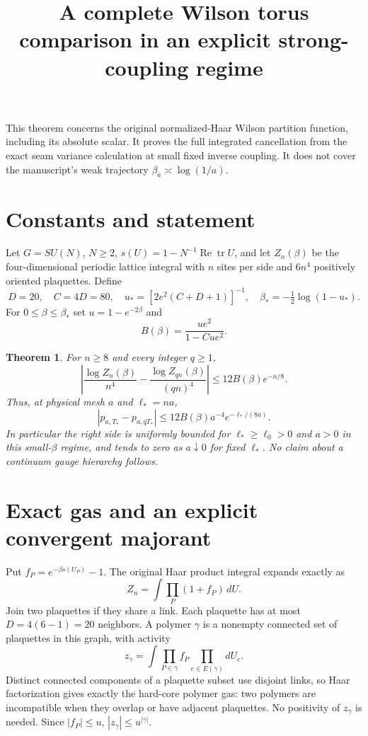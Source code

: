 \documentclass{article}
\title{A complete Wilson torus comparison in an explicit strong-coupling regime}\author{}\date{}
\newtheorem{theorem}{Theorem}
\begin{document}
\maketitle
This theorem concerns the original normalized-Haar Wilson partition function, including its absolute scalar. It proves the full integrated cancellation from the exact seam variance calculation at small fixed inverse coupling. It does not cover the manuscript's weak trajectory $\beta_a\asymp\log(1/a)$.

\section{Constants and statement}
Let $G=SU(N)$, $N\geq2$, $s(U)=1-N^{-1}\operatorname{Re}\operatorname{tr}U$, and let $Z_n(\beta)$ be the four-dimensional periodic lattice integral with $n$ sites per side and $6n^4$ positively oriented plaquettes. Define
\[
 D=20,\quad C=4D=80,\quad
 u_*=[2e^2(C+D+1)]^{-1},\quad
 \beta_*=-\tfrac12\log(1-u_*).
 \tag{1}
\]
For $0\leq\beta\leq\beta_*$ set $u=1-e^{-2\beta}$ and
\[
 B(\beta)=\frac{ue^2}{1-Cue^2}.
 \tag{2}
\]
\begin{theorem}
For $n\geq8$ and every integer $q\geq1$,
\[
 \left|\frac{\log Z_n(\beta)}{n^4}
 -\frac{\log Z_{qn}(\beta)}{(qn)^4}\right|
 \leq12B(\beta)e^{-n/8}.
 \tag{3}
\]
Thus, at physical mesh $a$ and $\ell_*=na$,
\[
 |p_{a,T_*}-p_{a,qT_*}|\leq
 12B(\beta)a^{-4}e^{-\ell_*/(8a)}.
 \tag{4}
\]
In particular the right side is uniformly bounded for $\ell_*\geq\ell_0>0$ and $a>0$ in this small-$\beta$ regime, and tends to zero as $a\downarrow0$ for fixed $\ell_*$. No claim about a continuum gauge hierarchy follows.
\end{theorem}

\section{Exact gas and an explicit convergent majorant}
Put $f_P=e^{-\beta s(U_P)}-1$. The original Haar product integral expands exactly as
\[
 Z_n=\int\prod_P(1+f_P)\,dU.
\]
Join two plaquettes if they share a link. Each plaquette has at most $D=4(6-1)=20$ neighbors. A polymer $\gamma$ is a nonempty connected set of plaquettes in this graph, with activity
\[
 z_\gamma=\int\prod_{P\in\gamma}f_P\prod_{e\in E(\gamma)}dU_e.
 \tag{5}
\]
Distinct connected components of a plaquette subset use disjoint links, so Haar factorization gives exactly the hard-core polymer gas: two polymers are incompatible when they overlap or have adjacent plaquettes. No positivity of $z_\gamma$ is needed. Since $|f_P|\leq u$,
$|z_\gamma|\leq u^{|\gamma|}$.
\end{document}
